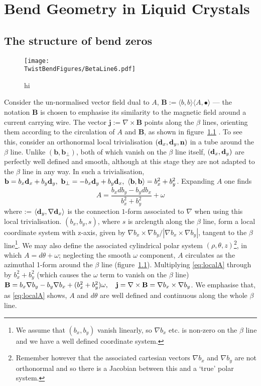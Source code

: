 \chapter{Bend Geometry in Liquid Crystals}
\label{ch:TwistBend}
\section{The structure of bend zeros}
\begin{figure}[htbp]
    \centering
    \texttt{[image: \\TwistBendFigures/BetaLine6.pdf]}
    \caption{hi}
    \label{fig:BetaLines}
\end{figure}

Consider the un-normalised vector field dual to $A$, $\mathbf{B} := \langle b,b \rangle \langle A, \bullet \rangle$ --- the notation $\mathbf{B}$ is chosen to emphasise its similarity to the magnetic field around a current carrying wire. The vector $\mathbf{j} := \nabla \times \mathbf{B}$ points along the $\beta$ lines, orienting them according to the circulation of $A$ and $\mathbf{B}$, as shown in figure~\ref{fig:BetaLines} \cite{MachonThesis}. To see this, consider an orthonormal local trivialisation $(\mathbf{d}_x, \mathbf{d}_y,\bf n)$ in a tube around the $\beta$ line. Unlike $(\mathbf{b}, \mathbf{b}_\perp)$, both of which vanish on the $\beta$ line itself, $(\mathbf{d}_x, \mathbf{d}_y)$ are perfectly well defined and smooth, although at this stage they are not adapted to the $\beta$ line in any way. In such a trivialisation, ${\bf b} = b_x \mathbf{d}_x + b_y \mathbf{d}_y,\ {\bf b}_\perp = -b_x \mathbf{d}_y + b_y \mathbf{d}_x,\ \langle \mathbf{b}, \mathbf{b} \rangle = b_x^2 + b_y^2$. Expanding $A$ one finds
\begin{equation}
    A = \frac{b_x d b_y - b_y d b_x}{b_x^2 + b_y^2}+ \omega
    \label{eq:localA}
\end{equation}
where \omega := $\langle \mathbf{d}_y, \nabla \mathbf{d}_x \rangle$ is the connection $1$-form associated to $\nabla$ when using this local trivialisation. $(b_x,b_y,s)$, where $s$ is arclength along the $\beta$ line, form a local coordinate system with z-axis, given by $\nabla b_x \times \nabla b_y/|\nabla b_x \times \nabla b_y|$, tangent to the $\beta$ line\footnote{We assume that $(b_x, b_y)$ vanish linearly, so $\nabla b_x$ etc. is non-zero on the $\beta$ line and we have a well defined coordinate system.}. We may also define the associated cylindrical polar system $(\rho,\theta,z)$\footnote{Remember however that the associated cartesian vectors $\nabla b_x$ and $\nabla b_y$ are not orthonormal and so there is a Jacobian between this and a `true' polar system.}, in which $A = d\theta + \omega$; neglecting the smooth $\omega$ component, $A$ circulates as the azimuthal 1-form around the $\beta$ line (figure~\ref{fig:BetaLines}). Multiplying \eqref{eq:localA} through by $b_x^2 + b_y^2$ (which causes the $\omega$ term to vanish on the $\beta$ line) $\mathbf{B} = b_x \nabla b_y - b_y \nabla b_x + (b_x^2 + b_y^2) \omega , \quad \mathbf{j} = \nabla \times \mathbf{B} =\nabla b_x \times \nabla b_y$. We emphasise that, as \eqref{eq:localA} shows, $A$ and $d\theta$ are well defined and continuous along the whole $\beta$ line.

